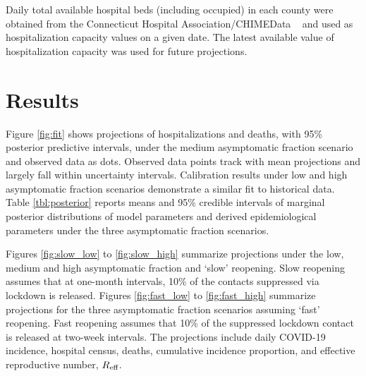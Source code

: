 \documentclass[11pt]{article}
\newcommand{\comments}[1]{[\textcolor{red}{#1}]}
\begin{document}

Daily total available hospital beds (including occupied) in each county were obtained from the Connecticut Hospital Association/CHIMEData ~\citep{CHAwebsite,CHIMEData} and used as hospitalization capacity values on a given date. The latest available value of hospitalization capacity was used for future projections.






\section{Results}


Figure \ref{fig:fit} shows projections of hospitalizations and deaths, with 95\% posterior predictive intervals, under the medium asymptomatic fraction scenario and observed data as dots.  Observed data points track with mean projections and largely fall within uncertainty intervals.  Calibration results under low and high asymptomatic fraction scenarios demonstrate a similar fit to historical data.  
Table \ref{tbl:posterior} reports means and 95\% credible intervals of marginal posterior distributions of model parameters and derived epidemiological parameters under the three asymptomatic fraction scenarios.

Figures \ref{fig:slow_low} to \ref{fig:slow_high} summarize projections under the low, medium and high asymptomatic fraction and `slow' reopening. Slow reopening assumes that at one-month intervals, 10\% of the contacts suppressed via lockdown is released. Figures \ref{fig:fast_low} to \ref{fig:fast_high} summarize projections for the three asymptomatic fraction scenarios assuming `fast' reopening. Fast reopening assumes that 10\% of the suppressed lockdown contact is released at two-week intervals. The projections include daily COVID-19 incidence, hospital census, deaths, cumulative incidence proportion, and effective reproductive number, $R\textsubscript{eff}$. 
\end{document}
